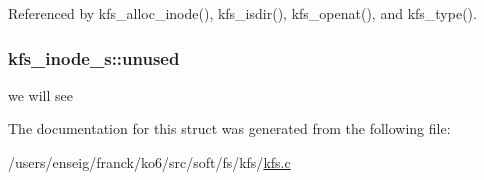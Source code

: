 Referenced by kfs\-\_\-alloc\-\_\-inode(), kfs\-\_\-isdir(), kfs\-\_\-openat(), and kfs\-\_\-type().

\hypertarget{structkfs__inode__s_a53daf3151e8bd7995cb4f10a9b2510c0}{
\subsubsection[{unused}]{ kfs\-\_\-inode\-\_\-s\-::unused}}\label{structkfs__inode__s_a53daf3151e8bd7995cb4f10a9b2510c0}


we will see 



The documentation for this struct was generated from the following file\-:\begin{DoxyCompactItemize}
\item 
/users/enseig/franck/ko6/src/soft/fs/kfs/\hyperlink{kfs_8c}{kfs.\-c}\end{DoxyCompactItemize}
